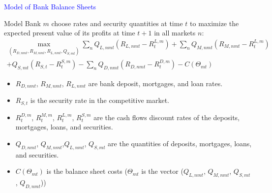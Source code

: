 \documentclass[notes,11pt, aspectratio=169]{beamer}
\begin{document}





\begin{frame}
    \textcolor{blue}{\huge{\centerline{Model of Bank Balance Sheets}}}

\end{frame}
    
\begin{frame}{Model}
    \vspace{0.3cm}
    Bank $m$ choose rates and security quantities at time $t$ to maximize the expected present value of its profits at time $t+1$ in all markets $n$:
    \begin{equation}
        \begin{gathered}
        \max _{\left(R_{D, n m t}, R_{M, n m t}, R_{L, n m t}, Q_{S, m t}\right)} \sum_n Q_{L, n m t}\left(R_{L, n m t}-R_t^{L, m}\right)+\sum_n Q_{M, n m t}\left(R_{M, n m t}-R_t^{L, m}\right) \\
        +Q_{S, m t}\left(R_{S, t}-R_t^{S, m}\right)-\sum_n Q_{D, n m t}\left(R_{D, n m t}-R_t^{D, m}\right)-C\left(\Theta_{m t}\right)
        \end{gathered}
        \end{equation}
        \vspace{0.1cm}
        \begin{itemize}
            \item $R_{D,nmt}$, $R_{M,nmt}$, $R_{L,nmt}$ are bank deposit, mortgages, and loan rates.
            \item $R_{S,t}$ is the security rate in the competitive market. 
            \item $R^{D,m}_t$, $R^{M,m}_t$, $R^{L,m}_t$, $R^{S,m}_t$ are the cash flows discount rates of the deposits, mortgages, loans, and securities.
            \item $Q_{D, n m t}$,  $Q_{M, n m t}$,$Q_{L, n m t}$, $Q_{S, m t}$ are the quantities of deposits, mortgages, loans, and securities.
            \item $C(\Theta_{mt})$ is the balance sheet costs ($\Theta_{mt}$ is the vector ($Q_{L, n m t}$, $Q_{M, n m t}$, $Q_{S, m t}$, $Q_{D, n m t}$))
    
            
        \end{itemize}
    \end{frame}
    
\end{document}
